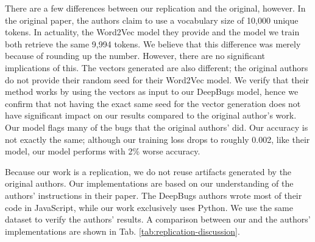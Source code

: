 There are a few differences between our replication and the original, however. In the original paper, the authors claim to use a vocabulary size of 10,000 unique tokens. In actuality, the Word2Vec model they provide and the model we train both retrieve the same 9,994 tokens. We believe that this difference was merely because of rounding up the number. However, there are no significant implications of this. The vectors generated are also different; the original authors do not provide their random seed for their Word2Vec model. We verify that their method works by using the vectors as input to our DeepBugs model, hence we confirm that not having the exact same seed for the vector generation does not have significant impact on our results compared to the original author's work. Our model flags many of the bugs that the original authors' did. Our accuracy is not exactly the same; although our training loss drops to roughly 0.002, like their model, our model performs with 2\% worse accuracy.

Because our work is a replication, we do not reuse artifacts generated by the original authors. Our implementations are based on our understanding of the authors' instructions in their paper. The DeepBugs authors wrote most of their code in JavaScript, while our work exclusively uses Python. We use the same dataset to verify the authors' results. A comparison between our and the authors' implementations are shown in Tab. \ref{tab:replication-discussion}.

